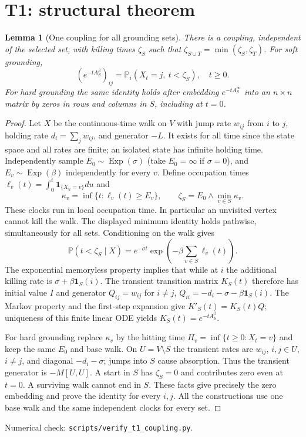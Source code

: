 \documentclass[11pt]{article}
\newtheorem{lemma}[theorem]{Lemma}
\newcommand{\Prob}{\mathbb P}
\newcommand{\ind}{\mathbf 1}
\begin{document}
\section{T1: structural theorem}
\begin{lemma}[One coupling for all grounding sets]\label{lem:coupling}
There is a coupling, independent of the selected set, with killing times
$\zeta_S$ such that $\zeta_{S\cup T}=\min(\zeta_S,\zeta_T)$.
For soft grounding,
\[
 (e^{-tA_S^\beta})_{ij}=\Prob_i(X_t=j,\ t<\zeta_S),\quad t\geq0.
\]
For hard grounding the same identity holds after embedding
$e^{-tA_S^\infty}$ into an $n\times n$ matrix by zeros in rows and
columns in $S$, including at $t=0$.
\end{lemma}
\begin{proof}
Let $X$ be the continuous-time walk on $V$ with jump rate $w_{ij}$ from
$i$ to $j$, holding rate $d_i=\sum_j w_{ij}$, and generator $-L$.
It exists for all time since the state space and all rates are finite;
an isolated state has infinite holding time. Independently sample
$E_0\sim\operatorname{Exp}(\sigma)$ (take $E_0=\infty$ if $\sigma=0$),
and $E_v\sim\operatorname{Exp}(\beta)$ independently for every $v$.
Define occupation times $\ell_v(t)=\int_0^t\ind_{\{X_u=v\}}du$ and
\[
 \kappa_v=\inf\{t:\ell_v(t)\geq E_v\},\qquad
 \zeta_S=E_0\wedge\min_{v\in S}\kappa_v.
\]
These clocks run in local occupation time. In particular an unvisited
vertex cannot kill the walk. The displayed minimum identity holds
pathwise, simultaneously for all sets. Conditioning on the walk gives
\[
 \Prob(t<\zeta_S\mid X)=
 e^{-\sigma t}\exp\left(-\beta\sum_{v\in S}\ell_v(t)\right).
\]
The exponential memoryless property implies that while at $i$ the
additional killing rate is $\sigma+\beta\ind_S(i)$. The transient
transition matrix $K_S(t)$ therefore has initial value $I$ and generator
$Q_{ij}=w_{ij}$ for $i\ne j$, $Q_{ii}=-d_i-\sigma-\beta\ind_S(i)$.
The Markov property and the first-step expansion give $K'_S(t)=K_S(t)Q$;
uniqueness of this finite linear ODE yields $K_S(t)=e^{-tA_S^\beta}$.

For hard grounding replace $\kappa_v$ by the hitting time
$H_v=\inf\{t\geq0:X_t=v\}$ and keep the same $E_0$ and base walk.
On $U=V\setminus S$ the transient rates are $w_{ij}$, $i,j\in U$, $i\ne j$,
and diagonal $-d_i-\sigma$; jumps into $S$ cause absorption.
Thus the transient generator is $-M[U,U]$. A start in $S$ has
$\zeta_S=0$ and contributes zero even at $t=0$. A surviving walk cannot
end in $S$. These facts give precisely the zero embedding and prove
the identity for every $i,j$. All the constructions use one base walk
and the same independent clocks for every set.
\end{proof}
\noindent Numerical check: \texttt{scripts/verify\_t1\_coupling.py}.
\end{document}
